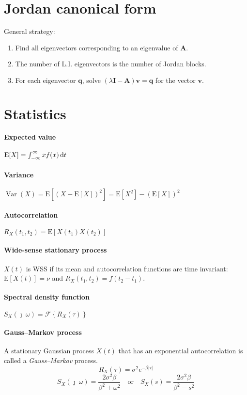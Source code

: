 \documentclass[a4paper]{article}
\newcommand{\M}[1]{\bm{#1}}
\newcommand{\Mc}[1]{\mathbf{#1}}
\newcommand{\V}[1]{\mathbf{#1}}
\newcommand{\E}{\text{E}}
\newcommand{\Var}{\operatorname{Var}}
\newcommand{\fourier}{\mathcal{F}}
\begin{document}
\section{Jordan canonical form}
General strategy:
\begin{enumerate}
\item Find all eigenvectors corresponding to an eigenvalue of $\M{A}$.
\item The number of L.I. eigenvectors is the number of Jordan blocks.
\item For each eigenvector $\V{q}$, solve $(\lambda \Mc{I} - \M{A}) \V{v} = \V{q}$ for the vector $\V{v}$.
\end{enumerate}



\section{Statistics}
\paragraph{Expected value} $\E[X] = \int_{-\infty}^{\infty} x f(x) \dif t$
\paragraph{Variance} $\Var(X) = \E[(X-\E[X])^{2}] = \E[X^{2}] - (\E[X])^{2}$
\paragraph{Autocorrelation} $R_X(t_1, t_2) = \E[X(t_1)X(t_2)]$
\paragraph{Wide-sense stationary process} $X(t)$ is WSS if its mean and autocorrelation functions are time invariant: \quad  $\E[X(t)] = \nu$ \quad and \quad $R_X(t_1, t_2) = f(t_2-t_1)$.
\paragraph{Spectral density function} $S_X(\jmath\:\omega) = \fourier\left\{ R_X(\tau) \right\}$
\paragraph{Gauss--Markov process} A stationary Gaussian process $X(t)$ that has an exponential autocorrelation is called a \emph{Gauss--Markov} process.
$$R_X(\tau) = \sigma^2 e^{-\beta |\tau|}$$ $$S_X(\jmath\:\omega) = \frac{2\sigma^2\beta}{\beta^2 + \omega^2} \quad\text{or}\quad S_X(s) = \frac{2\sigma^2\beta}{\beta^2 - s^2}$$
\end{document}
